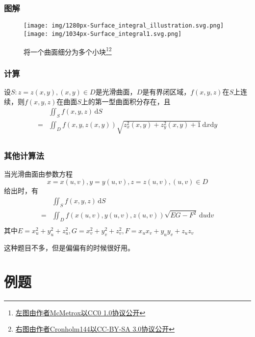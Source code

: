 \documentclass[xetex]{beamer}
\begin{document}
    \begin{frame}
        \frametitle{图解}
    
        \begin{figure}[ht]
            \centering
            \texttt{[image: img/1280px-Surface\_integral\_illustration.svg.png]}
            \texttt{[image: img/1034px-Surface\_integral1.svg.png]}
            \caption{将一个曲面细分为多个小块\footnote[1]{\href{https://commons.wikimedia.org/wiki/File:Surface_integral_illustration.svg}{左图由作者McMetrox以CC0 1.0协议公开}}\footnote[2]{\href{https://commons.wikimedia.org/wiki/File:Surface_integral1.svg}{右图由作者Cronholm144以CC-BY-SA 3.0协议公开}}}
            \label{fig:intplate}
        \end{figure}
    
    \end{frame}

    \begin{frame}
        \frametitle{计算}
    
        设$S: z=z(x,y), (x,y)\in D$是光滑曲面，$D$是有界闭区域，$f(x,y,z)$在$S$上连续，则$f(x,y,z)$在曲面$S$上的第一型曲面积分存在，且
        \begin{align*}
            &\iint_Sf(x,y,z)\, \textrm{d}S \\
            =&\iint_D f(x, y, z(x,y))\sqrt{z_x^2(x,y) + z_y^2(x,y)+1}\, \textrm{d}x\textrm{d}y\\
        \end{align*}
    
    \end{frame}

    \begin{frame}
        \frametitle{其他计算法}
    
        当光滑曲面由参数方程
        $$x=x(u,v), y=y(u,v), z=z(u,v), (u,v) \in D$$
        给出时，有
        \begin{align*}
            &\iint_Sf(x,y,z)\, \textrm{d}S \\
            =&\iint_D f(x(u,v), y(u,v), z(u,v))\sqrt{EG-F^2}\, \textrm{d}u\textrm{d}v\\
        \end{align*}
        其中$E=x_u^2+y_u^2+z_u^2, G=x_v^2+y_v^2+z_v^2, F=x_ux_v+y_uy_v+z_uz_v$

        这种题目不多，但是偏偏有的时候很好用。
    
    \end{frame}

    \section{例题}
\end{document}
